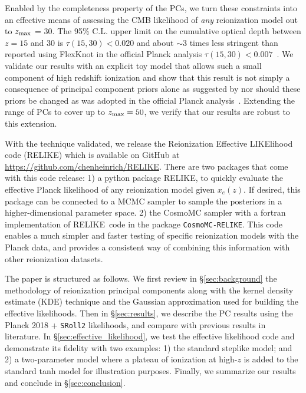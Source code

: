 \documentclass[aps,prd,twocolumn,amsmath,amssymb,showpacs,floatfix,superscriptaddress,nofootinbib]{revtex4-1}
\newcommand{\zmax}{z_{\rm max}}
\newcommand{\relike}{RELIKE}
\newcommand{\cosmomcrelike}{\texttt{CosmoMC-RELIKE}}
\begin{document}
Enabled by the completeness property of the PCs, we turn these constraints into an effective means of  assessing the CMB likelihood of \textit{any} reionization model out to $\zmax$ = 30. 
The 95\% C.L. upper limit on the cumulative optical depth between $z=15$ and 30 is $\tau(15, 30) < 0.020$  and about $\sim3$ times less stringent than reported using FlexKnot in the official Planck analysis $\tau(15, 30)<0.007$~\cite{Aghanim:2018eyx}.  We validate our results with an explicit toy model that allows such a small component of high redshift ionization and show that this result is not simply a consequence of principal component priors alone as suggested by \cite{Millea:2018bko} nor should these priors be changed as was adopted in the official Planck analysis~\cite{Aghanim:2018eyx}.
Extending the range of PCs to cover up to $z_{\rm max} = 50$, we verify that our results are robust to this extension.

With the technique  validated,
we release the Reionization Effective LIKElihood code (\relike) which is available on GitHub at \url{https://github.com/chenheinrich/RELIKE}. There are two packages that come with this code release: 1)  a python package \relike, to quickly evaluate the effective Planck likelihood of any reionization model given $x_e(z)$. If desired, this package can be connected to a MCMC sampler to sample the posteriors in a higher-dimensional parameter space. 2)  the CosmoMC sampler with a fortran implementation of \relike\  code in the package \cosmomcrelike. This code enables a  much simpler and faster testing of specific reionization models with the Planck data, and provides a  consistent way of combining this information with other reionization datasets. 

The paper is structured as follows. We first review in \S\ref{sec:background} the methodology of  reionization principal components along with the kernel density estimate (KDE) technique and the Gaussian approximation \cite{Heinrich:2016ojb} used for building the effective likelihoods. Then in \S\ref{sec:results}, we describe the PC results using the Planck 2018 + \texttt{SRoll2} likelihoods, and compare with previous results in literature. In \S\ref{sec:effective_likelihood}, we test the effective likelihood code and demonstrate its fidelity with two examples: 1) the standard steplike model; and 2) a two-parameter model where a plateau of ionization at high-$z$ is added to the standard tanh model for illustration purposes. Finally, we summarize our results and conclude in \S\ref{sec:conclusion}.
\end{document}
